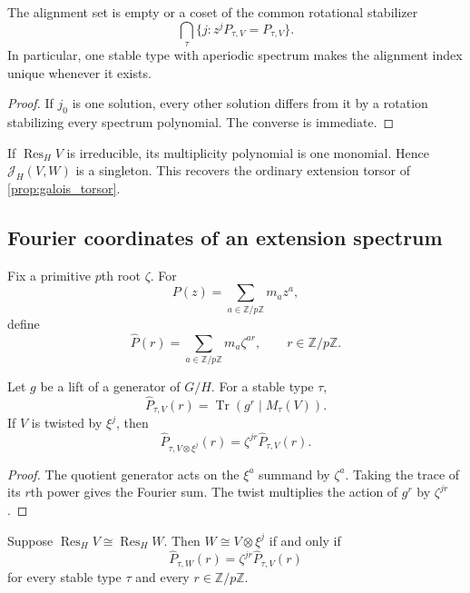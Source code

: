 \documentclass{aomart}
\theoremstyle{definition}
\theoremstyle{remark}
\newcommand{\ZZ}{\mathbb Z}
\newcommand{\Tr}{\operatorname{Tr}}
\newcommand{\Res}{\operatorname{Res}}
\newcommand{\calJ}{\mathcal J}
\begin{document}
\begin{corollary}\label{cor:alignment_coset}
The alignment set is empty or a coset of the common rotational stabilizer
\[
 \bigcap_\tau
 \{j:z^jP_{\tau,V}=P_{\tau,V}\}.
\]
In particular, one stable type with aperiodic spectrum makes the alignment index unique whenever it exists.
\end{corollary}

\begin{proof}
If \(j_0\) is one solution, every other solution differs from it by a rotation stabilizing every spectrum polynomial. The converse is immediate.
\end{proof}

\begin{example}\label{ex:irreducible_stable}
If \(\Res_HV\) is irreducible, its multiplicity polynomial is one monomial. Hence \(\calJ_H(V,W)\) is a singleton. This recovers the ordinary extension torsor of \cref{prop:galois_torsor}.
\end{example}



\subsection{Fourier coordinates of an extension spectrum}

Fix a primitive \(p\)th root \(\zeta\). For
\[
 P(z)=\sum_{a\in\ZZ/p\ZZ}m_az^a,
\]
define
\[
 \widehat P(r)
 =
 \sum_{a\in\ZZ/p\ZZ}m_a\zeta^{ar},
 \qquad
 r\in\ZZ/p\ZZ.
\]

\begin{proposition}\label{prop:fourier_trace}
Let \(g\) be a lift of a generator of \(G/H\). For a stable type \(\tau\),
\[
 \boxed{
 \widehat P_{\tau,V}(r)
 =
 \Tr\left(g^r\mid M_\tau(V)\right).
 }
\]
If \(V\) is twisted by \(\xi^j\), then
\[
 \boxed{
 \widehat P_{\tau,V\otimes\xi^j}(r)
 =
 \zeta^{jr}\widehat P_{\tau,V}(r).
 }
\]
\end{proposition}

\begin{proof}
The quotient generator acts on the \(\xi^a\) summand by \(\zeta^a\). Taking the trace of its \(r\)th power gives the Fourier sum. The twist multiplies the action of \(g^r\) by \(\zeta^{jr}\).
\end{proof}

\begin{corollary}\label{cor:fourier_attachment}
Suppose \(\Res_HV\cong\Res_HW\). Then \(W\cong V\otimes\xi^j\) if and only if
\[
 \boxed{
 \widehat P_{\tau,W}(r)
 =
 \zeta^{jr}\widehat P_{\tau,V}(r)
 }
\]
for every stable type \(\tau\) and every \(r\in\ZZ/p\ZZ\).
\end{corollary}
\end{document}
